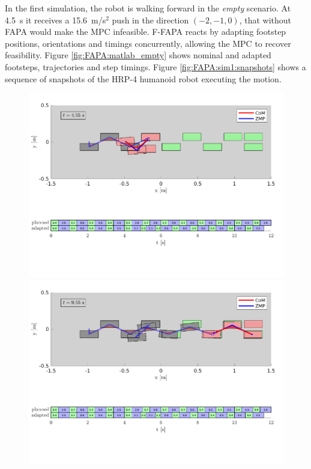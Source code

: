 In the first simulation, the robot is walking forward in the {\em empty} scenario. At 4.5~s it receives a 15.6~m/s$^2$ push in the direction $(-2, -1, 0)$, that without FAPA would make the MPC infeasible. F-FAPA reacts by adapting footstep positions, orientations and timings concurrently, allowing the MPC to recover feasibility. Figure \ref{fig:FAPA:matlab_empty} shows nominal and adapted footsteps, trajectories and step timings. Figure \ref{fig:FAPA:sim1:snapshots} shows a sequence of snapshots of the HRP-4 humanoid robot executing the motion.
\begin{figure}
    \centering
    \includegraphics[trim={0 5.9cm 0 0.7cm},clip,width=\textwidth]{figures/empty-fixed-plot-after-push.pdf}
    \includegraphics[trim={0 5.9cm 0 0.7cm},clip,width=\textwidth]{figures/empty-fixed-plot-completing-task.pdf}

\end{figure}

